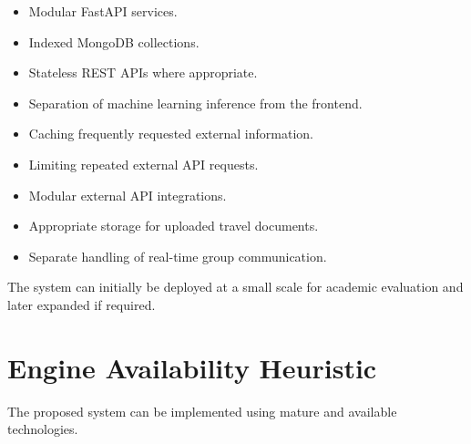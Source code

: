 \documentclass[11pt,a4paper]{article}
\begin{document}
\begin{itemize}

\item Modular FastAPI services.

\item Indexed MongoDB collections.

\item Stateless REST APIs where appropriate.

\item Separation of machine learning inference from the frontend.

\item Caching frequently requested external information.

\item Limiting repeated external API requests.

\item Modular external API integrations.

\item Appropriate storage for uploaded travel documents.

\item Separate handling of real-time group communication.

\end{itemize}

The system can initially be deployed at a small scale for academic evaluation and later expanded if required.



\section{Engine Availability Heuristic}

The proposed system can be implemented using mature and available technologies.
\end{document}
